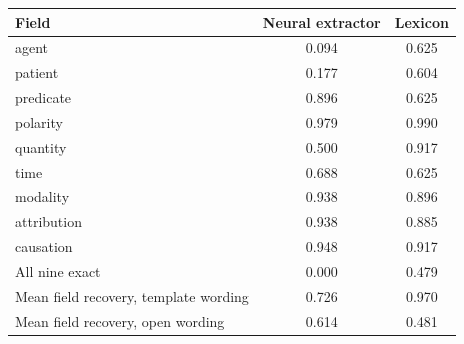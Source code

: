 \begin{tabular}{@{}lcc@{}}
\toprule
Field & Neural extractor & Lexicon \\
\midrule
agent & 0.094 & 0.625 \\
patient & 0.177 & 0.604 \\
predicate & 0.896 & 0.625 \\
polarity & 0.979 & 0.990 \\
quantity & 0.500 & 0.917 \\
time & 0.688 & 0.625 \\
modality & 0.938 & 0.896 \\
attribution & 0.938 & 0.885 \\
causation & 0.948 & 0.917 \\
\midrule
All nine exact & 0.000 & 0.479 \\
Mean field recovery, template wording & 0.726 & 0.970 \\
Mean field recovery, open wording & 0.614 & 0.481 \\
\bottomrule
\end{tabular}
